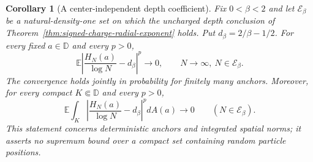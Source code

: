 \documentclass[11pt,a4paper]{article}
\numberwithin{equation}{section}
\newtheorem{corollary}[theorem]{Corollary}
\theoremstyle{definition}
\theoremstyle{remark}
\newcommand{\D}{\mathbb D}
\begin{document}
\begin{corollary}[A center-independent depth coefficient]
\label{cor:all-anchor-depth-coefficient}
Fix $0<\beta<2$ and let $\mathcal E_\beta$ be a natural-density-one set
on which the uncharged depth conclusion of
Theorem~\ref{thm:signed-charge-radial-exponent} holds.  Put
$d_\beta=2/\beta-1/2$.  For every fixed $a\in\D$ and every $p>0$,
\begin{equation}
 \mathbb E\left|\frac{H_N(a)}{\log N}-d_\beta\right|^p
       \longrightarrow0,
 \qquad N\to\infty,\ N\in\mathcal E_\beta.
 \label{eq:all-anchor-depth-moments}
\end{equation}
The convergence holds jointly in probability for finitely many anchors.
Moreover, for every compact $K\Subset\D$ and every $p>0$,
\begin{equation}
 \mathbb E\int_K
 \left|\frac{H_N(a)}{\log N}-d_\beta\right|^p dA(a)
       \longrightarrow0
 \qquad(N\in\mathcal E_\beta).
 \label{eq:all-anchor-depth-spatial-moments}
\end{equation}
This statement concerns deterministic anchors and integrated spatial
norms; it asserts no supremum bound over a compact set containing random
particle positions.
\end{corollary}
\end{document}
